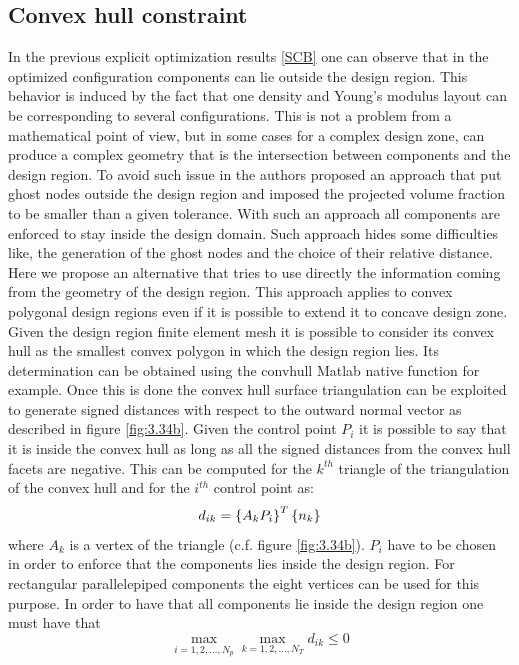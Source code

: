  \subsection{Convex hull constraint}
  \label{ss3.10.2}
  In the previous explicit optimization results \ref{SCB} one can observe that in the optimized configuration components can lie outside the design region. This behavior is induced by the fact that one density and Young's modulus layout can be corresponding to several configurations. This is not a problem from a mathematical point of view, but in some cases for a complex design zone, can produce a complex geometry that is the intersection between components and the design region. To avoid such issue in \cite{zhang2018geometry} the authors proposed an approach that put ghost nodes outside the design region and imposed the projected volume fraction to be smaller than a given tolerance. With such an approach all components are enforced to stay inside the design domain. Such approach hides some difficulties like, the generation of the ghost nodes and the choice of their relative distance. Here we propose an alternative that tries to use directly the information coming from the geometry of the design region. This approach applies to convex polygonal design regions even if it is possible to extend it to concave design zone. Given the design region finite element mesh it is possible to consider its convex hull as the smallest convex polygon in which the design region lies. Its determination can be obtained using the convhull Matlab native function for example. Once this is done the convex hull surface triangulation can be exploited to generate signed distances with respect to the outward normal vector as described in figure \ref{fig:3.34b}. Given the control point $P_i$ it is possible to say that it is inside the convex hull as long as all the signed distances from the convex hull facets are negative. This can be computed for the $k^{th}$ triangle of the triangulation of the convex hull and for the $i^{th}$ control point as:
  \begin{equation}
  d_{ik}=\left\lbrace{A_kP_i}\right \rbrace^T\left\lbrace{n_k}\right \rbrace
  \end{equation}
  where $A_k$ is a vertex of the triangle (c.f. figure \ref{fig:3.34b}). $P_i$ have to be chosen in order to enforce that the components lies inside the design region. For rectangular parallelepiped components the eight vertices can be used for this purpose. In order to have that all components lie inside the design region one must have that 
  \begin{equation}
    \max_{i=1,2,...,N_p} {\max_{k=1,2,...,N_T}{d_{ik}}}\leq 0
  \end{equation}
